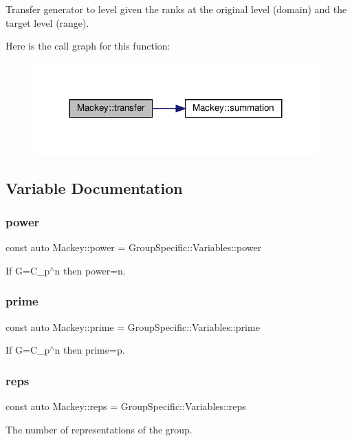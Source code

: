 Transfer generator to level given the ranks at the original level (domain) and the target level (range). 

Here is the call graph for this function\+:\nopagebreak
\begin{figure}[H]
\begin{center}
\leavevmode
\includegraphics[width=311pt]{namespaceMackey_a0550bf97e47b3c319cb5e1bd81008d89_cgraph}
\end{center}
\end{figure}


\subsection{Variable Documentation}
\mbox{\label{namespaceMackey_aafdaaabd06dd9ceefe6fa4f26d13a60d}} 
\subsubsection{\texorpdfstring{power}{power}}
{\footnotesize\ttfamily const auto Mackey\+::power = Group\+Specific\+::\+Variables\+::power}



If G=C\+\_\+p$^\wedge$n then power=n. 

\mbox{\label{namespaceMackey_a77e059c6f9b4c6ea096fcf94a7880bc3}} 
\subsubsection{\texorpdfstring{prime}{prime}}
{\footnotesize\ttfamily const auto Mackey\+::prime = Group\+Specific\+::\+Variables\+::prime}



If G=C\+\_\+p$^\wedge$n then prime=p. 

\mbox{\label{namespaceMackey_af282e8433677f2812cb242359f4cd0c1}} 
\subsubsection{\texorpdfstring{reps}{reps}}
{\footnotesize\ttfamily const auto Mackey\+::reps = Group\+Specific\+::\+Variables\+::reps}



The number of representations of the group. 

